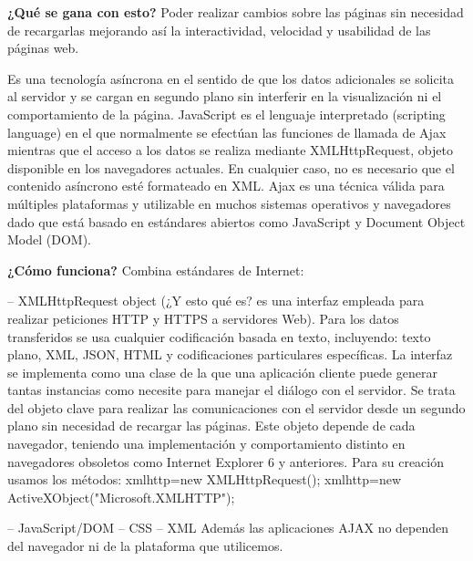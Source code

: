 \documentclass{apuntes}
\begin{document}
\textbf{¿Qué se gana con esto?}
Poder realizar cambios sobre las páginas sin necesidad de recargarlas mejorando así la interactividad, velocidad y usabilidad de las páginas web.

Es una tecnología asíncrona en el sentido de que los datos adicionales se solicita al servidor y se cargan en segundo plano sin interferir en la visualización ni el comportamiento de la página. JavaScript es el lenguaje interpretado (scripting language) en el que normalmente se efectúan las funciones de llamada de Ajax mientras que el acceso a los datos se realiza mediante XMLHttpRequest, objeto disponible en los navegadores actuales. En cualquier caso, no es necesario que el contenido asíncrono esté formateado en XML.
Ajax es una técnica válida para múltiples plataformas y utilizable en muchos sistemas operativos y navegadores dado que está basado en estándares abiertos como JavaScript y Document Object Model (DOM).

\textbf{¿Cómo funciona?}
Combina estándares de Internet:

– XMLHttpRequest object (¿Y esto qué es? es una interfaz empleada para realizar peticiones HTTP y HTTPS a servidores Web). Para los datos transferidos se usa cualquier codificación basada en texto, incluyendo: texto plano, XML, JSON, HTML y codificaciones particulares específicas. La interfaz se implementa como una clase de la que una aplicación cliente puede generar tantas instancias como necesite para manejar el diálogo con el servidor. Se trata del objeto clave para realizar las comunicaciones con el servidor desde un segundo plano  sin necesidad de recargar las páginas. Este objeto depende de cada navegador, teniendo una implementación y comportamiento distinto en navegadores obsoletos como Internet Explorer 6 y anteriores. Para su creación usamos los métodos: 
xmlhttp=new XMLHttpRequest();
xmlhttp=new ActiveXObject("Microsoft.XMLHTTP");

– JavaScript/DOM
– CSS
– XML
Además las aplicaciones AJAX no dependen del navegador ni de la plataforma que utilicemos.
\end{document}
